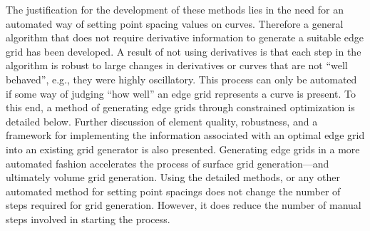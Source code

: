 The justification for the development of these methods lies in the need for an automated way of setting point spacing values on curves. Therefore a general algorithm that does not require derivative information to generate a suitable edge grid has been developed. A result of not using derivatives is that each step in the algorithm is robust to large changes in derivatives or curves that are not ``well behaved'', e.g., they were highly oscillatory. This process can only be automated if some way of judging ``how well'' an edge grid represents a curve is present. To this end, a method of generating edge grids through constrained optimization is detailed below. Further discussion of element quality, robustness, and a framework for implementing the information associated with an optimal edge grid into an existing grid generator is also presented. Generating edge grids in a more automated fashion accelerates the process of surface grid generation---and ultimately volume grid generation. Using the detailed methods, or any other automated method for setting point spacings does not change the number of steps required for grid generation. However, it does reduce the number of manual steps involved in starting the process.

